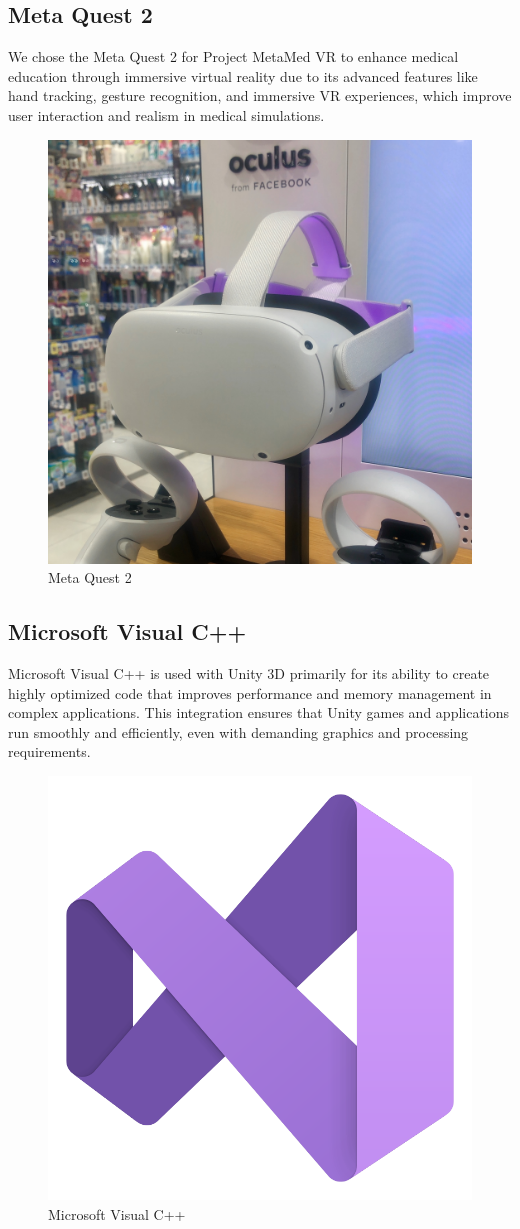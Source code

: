 \subsection{Meta Quest 2}
We chose the Meta Quest 2 for Project MetaMed VR to enhance medical education through immersive virtual reality due to its advanced features like hand tracking, gesture recognition, and immersive VR experiences, which improve user interaction and realism in medical simulations.
\begin{figure}[h]
	\centering
	\includegraphics[width=0.4\linewidth,height=0.3\linewidth]{Images/metaquest2.png}
	\caption{Meta Quest 2\cite{metaquest}}
\end{figure}
\newpage
\subsection{Microsoft Visual C++}
Microsoft Visual C++ is used with Unity 3D primarily for its ability to create highly optimized code that improves performance and memory management in complex applications. This integration ensures that Unity games and applications run smoothly and efficiently, even with demanding graphics and processing requirements.
\begin{figure}[h]
	\centering
	\includegraphics[width=0.2\linewidth,height=0.2\linewidth]{Images/VS Code.png}
	\caption{Microsoft Visual C++\cite{visual-studio-icon}}
\end{figure}